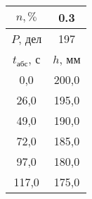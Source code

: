 \begin{tabular}[t]{|c|c|}
\hline
$n, \%$ & 0.3 \\
\hline
$P$, дел & 197 \\
\hline
$t_{абс}$, с & $h$, мм \\ 
\hline
0,0 & 200,0 \\ 
26,0 & 195,0 \\ 
49,0 & 190,0 \\ 
72,0 & 185,0 \\ 
97,0 & 180,0 \\ 
117,0 & 175,0 \\ 
\hline
\end{tabular}